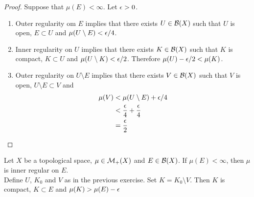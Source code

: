 \documentclass{book}
\begin{document}
	\begin{proof}
		Suppose that $\mu(E) < \infty$. Let $\epsilon >0$. 
		\begin{enumerate}
			\item Outer regularity om $E$ implies that there exists $U \in \mathcal{B}(X)$ such that $U$ is open, $E \subset U$ and $\mu(U \setminus E) < \epsilon/4$. 
			\item Inner regularity on $U$ implies that there exists $K \in \mathcal{B}(X)$ such that $K$ is compact, $K \subset U$ and $\mu(U \setminus K) < \epsilon/2$. Therefore $\mu(U) - \epsilon/2 < \mu(K) $.
			\item Outer regularity on $U \setminus E$ implies that there exists $V \in \mathcal{B}(X)$ such that $V$ is open, $U \setminus E \subset V$ and 
			\begin{align*}
				\mu(V) 
				& < \mu(U \setminus E) + \epsilon/4 \\
				& < \frac{\epsilon}{4} + \frac{\epsilon}{4} \\
				& = \frac{\epsilon}{2}
			\end{align*}
		\end{enumerate}
	\end{proof}
	
	\begin{ex}  
		Let $X$ be a topological space, $\mu \in \mathcal{M}_+(X)$ and $E \in \mathcal{B}(X)$. If $\mu(E) < \infty$, then $\mu$ is inner regular on $E$. \\
		 Define $U$, $K_0$ and $V$ as in the previous exercise. Set $K = K_0 \setminus V$. Then $K$ is compact, $K \subset E$ and $\mu(K) > \mu(E) - \epsilon$ 
	\end{ex}
	
\end{document}
